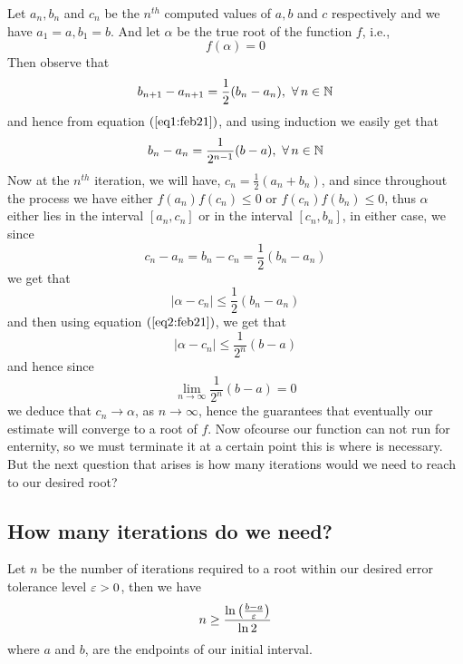 Let $a_n, b_n$ and $c_n$ be the $n^{th}$ computed values of $a,b$ and $c$ respectively and we have $a_1 = a, b_1 = b$. And let $\alpha$ be the true root of the function $f$, i.e., 
\[
    f(\alpha) = 0  
\]
Then observe that 
\begin{equation}\label{eq1:feb21}
    b_{n+1} - a_{n+1} = \frac{1}{2} (b_n - a_n), \ \forall \, n \in \mathbb{N}
\end{equation}
and hence from equation $(\ref{eq1:feb21})$, and using induction we easily get that 
\begin{equation}\label{eq2:feb21}
    b_n - a_n = \frac{1}{2^{n-1}} (b-a), \ \forall \, n \in \mathbb{N}
\end{equation} 
Now at the $n^{th}$ iteration, we will have, $c_n = \frac{1}{2}(a_n+b_n)$, and since throughout the process we have either $f(a_n) f(c_n) \leq 0$ or $f(c_n) f(b_n) \leq 0$, thus $\alpha$ either lies in the interval $[a_n, c_n]$ or in the interval $[c_n,b_n]$, in either case, we since 
\[
    c_n - a_n = b_n - c_n = \frac{1}{2}(b_n - a_n)  
\]
we get that 
\begin{equation*}
    |\alpha - c_n| \leq \frac{1}{2} (b_n - a_n)
\end{equation*}
and then using equation $(\ref{eq2:feb21})$, we get that 
\begin{equation}\label{eq3:feb21}
    |\alpha - c_n| \leq \frac{1}{2^n} (b-a)
\end{equation}
and hence since \[\lim_{n \to \infty} \frac{1}{2^n}(b-a) = 0\] we deduce that $c_n \to \alpha$, as $n \to \infty$, hence the  guarantees that eventually our estimate will converge to a root of $f$. Now ofcourse our function can not run for enternity, so we must terminate it at a certain point this is where  is necessary. But the next question that arises is how many iterations would we need to reach to our desired root? 

\subsection{How many iterations do we need?}

\begin{thm}
    Let $n$ be the number of iterations required to a root within our desired error tolerance level $\varepsilon > 0$, then we have 
    \[
        n \geq \frac{\ln{\left( \frac{b-a}{\varepsilon} \right)}}{\ln{2}}   
    \]
    where $a$ and $b$, are the endpoints of our initial interval. 
\end{thm}

